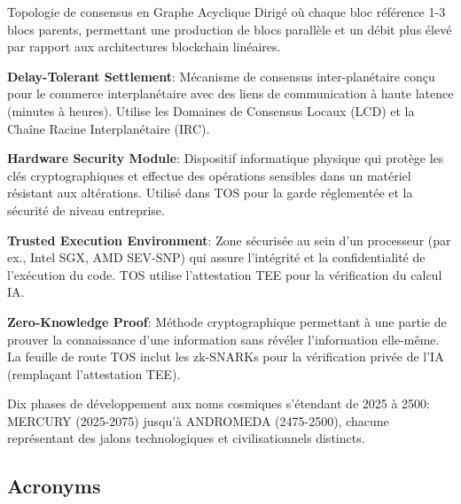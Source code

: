 \documentclass[11pt]{article}
\begin{document}
\begin{description}[leftmargin=3cm, style=nextline]
  \item[BlockDAG] Topologie de consensus en Graphe Acyclique Dirigé où chaque bloc référence 1-3 blocs parents, permettant une production de blocs parallèle et un débit plus élevé par rapport aux architectures blockchain linéaires.

  \item[DT-Settlement] \textbf{Delay-Tolerant Settlement}: Mécanisme de consensus inter-planétaire conçu pour le commerce interplanétaire avec des liens de communication à haute latence (minutes à heures). Utilise les Domaines de Consensus Locaux (LCD) et la Chaîne Racine Interplanétaire (IRC).

  \item[HSM] \textbf{Hardware Security Module}: Dispositif informatique physique qui protège les clés cryptographiques et effectue des opérations sensibles dans un matériel résistant aux altérations. Utilisé dans TOS pour la garde réglementée et la sécurité de niveau entreprise.

  \item[TEE] \textbf{Trusted Execution Environment}: Zone sécurisée au sein d'un processeur (par ex., Intel SGX, AMD SEV-SNP) qui assure l'intégrité et la confidentialité de l'exécution du code. TOS utilise l'attestation TEE pour la vérification du calcul IA.

  \item[ZK Proof] \textbf{Zero-Knowledge Proof}: Méthode cryptographique permettant à une partie de prouver la connaissance d'une information sans révéler l'information elle-même. La feuille de route TOS inclut les zk-SNARKs pour la vérification privée de l'IA (remplaçant l'attestation TEE).

  \item[Celestial Eras] Dix phases de développement aux noms cosmiques s'étendant de 2025 à 2500: MERCURY (2025-2075) jusqu'à ANDROMEDA (2475-2500), chacune représentant des jalons technologiques et civilisationnels distincts.
\end{description}

\subsection*{Acronyms}
\end{document}
